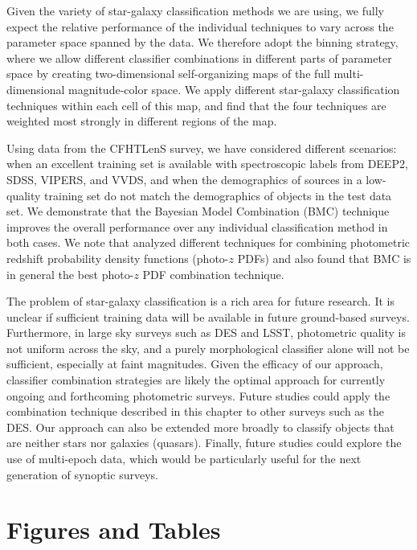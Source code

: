 Given the variety of star-galaxy classification methods we are using,
we fully expect the relative performance
of the individual techniques to vary across
the parameter space spanned by the data.
We therefore adopt the binning strategy, where
we allow different classifier combinations 
in different parts of parameter space
by creating two-dimensional self-organizing maps of
the full multi-dimensional magnitude-color space.
We apply different star-galaxy classification techniques
within each cell of this map,
and find that the four techniques are weighted most strongly
in different regions of the map.   

Using data from the CFHTLenS survey,
we have considered different scenarios:
when an excellent training set is available with spectroscopic labels from
DEEP2, SDSS, VIPERS, and VVDS, and
when the demographics of sources in a low-quality training set
do not match the demographics of objects in the test data set.
We demonstrate that the Bayesian Model Combination (BMC) technique improves
the overall performance over any individual classification method
in both cases.
We note that \citet{carrascokind2014exhausting} analyzed
different techniques for combining
photometric redshift probability density functions (photo-$z$ PDFs)
and also found that BMC is in general the best
photo-$z$ PDF combination technique.   

The problem of star-galaxy classification is a rich area
for future research.
It is unclear if sufficient training data will be available in future
ground-based surveys. Furthermore, in large sky surveys such as DES and LSST,
photometric quality is not uniform across the sky,
and a purely morphological classifier alone will not be sufficient,
especially at faint magnitudes.
Given the efficacy of our approach,
classifier combination strategies are likely the optimal approach
for currently ongoing and forthcoming photometric surveys.
Future studies could apply the combination technique described in this chapter
to other surveys such as the DES.
Our approach can also be extended more broadly to
classify objects that are neither stars nor galaxies (\eg quasars).
Finally, future studies could explore the use of multi-epoch data,
which would be particularly useful for the next generation of
synoptic surveys.

\newpage
\section{Figures and Tables}

